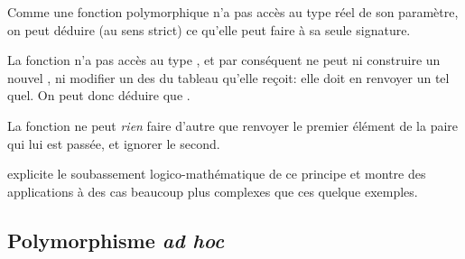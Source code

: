 \begin{infobox}

Comme une fonction polymorphique n'a pas accès au type réel de son paramètre, on peut déduire (au sens strict) ce qu'elle peut faire à sa seule signature.

La fonction  n'a pas accès au type , et par conséquent ne peut ni construire un nouvel , ni modifier un des  du tableau qu'elle reçoit: elle doit en renvoyer un tel quel. On peut donc déduire que .

La fonction  ne peut \emph{rien} faire d'autre que renvoyer le premier élément de la paire qui lui est passée, et ignorer le second.

    \begin{refblock}
        \textcite{Wadler1989} explicite le soubassement logico-mathématique de ce principe et montre des applications à des cas beaucoup plus complexes que ces quelque exemples.
    \end{refblock}

\end{infobox}

\subsection{Polymorphisme \emph{ad hoc}}
